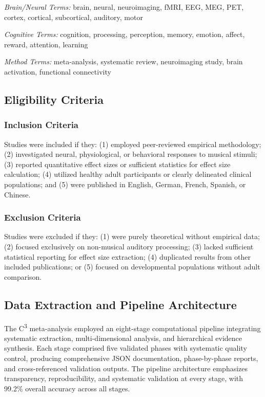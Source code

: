 \documentclass[9pt,onecolumn]{article}
\begin{document}
\textit{Brain/Neural Terms:} brain, neural, neuroimaging, fMRI, EEG, MEG, PET, cortex, cortical, subcortical, auditory, motor

\textit{Cognitive Terms:} cognition, processing, perception, memory, emotion, affect, reward, attention, learning

\textit{Method Terms:} meta-analysis, systematic review, neuroimaging study, brain activation, functional connectivity


\subsection{Eligibility Criteria}

\subsubsection{Inclusion Criteria}

Studies were included if they: (1) employed peer-reviewed empirical methodology; (2) investigated neural, physiological, or behavioral responses to musical stimuli; (3) reported quantitative effect sizes or sufficient statistics for effect size calculation; (4) utilized healthy adult participants or clearly delineated clinical populations; and (5) were published in English, German, French, Spanish, or Chinese.

\subsubsection{Exclusion Criteria}

Studies were excluded if they: (1) were purely theoretical without empirical data; (2) focused exclusively on non-musical auditory processing; (3) lacked sufficient statistical reporting for effect size extraction; (4) duplicated results from other included publications; or (5) focused on developmental populations without adult comparison.

\subsection{Data Extraction and Pipeline Architecture}

The C\textsuperscript{3} meta-analysis employed an eight-stage computational pipeline integrating systematic extraction, multi-dimensional analysis, and hierarchical evidence synthesis. Each stage comprised five validated phases with systematic quality control, producing comprehensive JSON documentation, phase-by-phase reports, and cross-referenced validation outputs. The pipeline architecture emphasizes transparency, reproducibility, and systematic validation at every stage, with 99.2\% overall accuracy across all stages.
\end{document}
